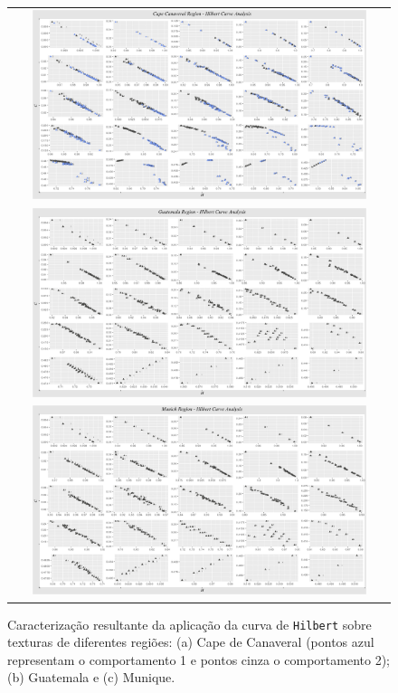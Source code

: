 \documentclass[remotesensing,article,submit,moreauthors,pdftex,10pt,a4paper]{Definitions/mdpi}
\begin{document}
	
	\begin{figure}[!h]
		\begin{tabular}{c}
			\includegraphics[width=0.9\textwidth]{Figures/CapehilbertPlots.png}\\
			\includegraphics[width=0.9\textwidth]{Figures/GuatemalahilbertPlots.png}\\
			\includegraphics[width=0.9\textwidth]{Figures/MunichhilbertPlots.png}\\
		\end{tabular}
		\caption{Caracterização resultante da aplicação da curva de \texttt{Hilbert} sobre texturas de diferentes regiões: (a) Cape de Canaveral (pontos azul representam o comportamento 1 e pontos cinza o comportamento 2); (b) Guatemala e (c) Munique.}
		\label{Fig:PlotsHilbert}
	\end{figure}
	
\end{document}
